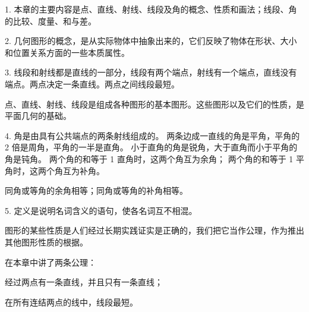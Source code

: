 \xiaojie

1. 本章的主要内容是点、直线、射线、线段及角的概念、性质和画法；线段、角的比较、度量、和与差。

2. 几何图形的概念，是从实际物体中抽象出来的，它们反映了物体在形状、大小和位置关系方面的一些本质属性。

3. 线段和射线都是直线的一部分，线段有两个端点，射线有一个端点，直线没有端点。两点决定一条直线。两点之间线段最短。

点、直线、射线、线段是组成各种图形的基本图形。这些图形以及它们的性质，是平面几何的基础。

4. 角是由具有公共端点的两条射线组成的。
两条边成一直线的角是平角，平角的 2 倍是周角，平角的一半是直角。
小于直角的角是锐角，大于直角而小于平角的角是钝角。
两个角的和等于 1 直角时，这两个角互为余角；
两个角的和等于 1 平角时，这两个角互为补角。

同角或等角的余角相等；同角或等角的补角相等。

5. 定义是说明名词含义的语句，使各名词互不相混。

图形的某些性质是人们经过长期实践证实是正确的，我们把它当作公理，作为推出其他图形性质的根据。

在本章中讲了两条公理：

经过两点有一条直线，并且只有一条直线；

在所有连结两点的线中，线段最短。

